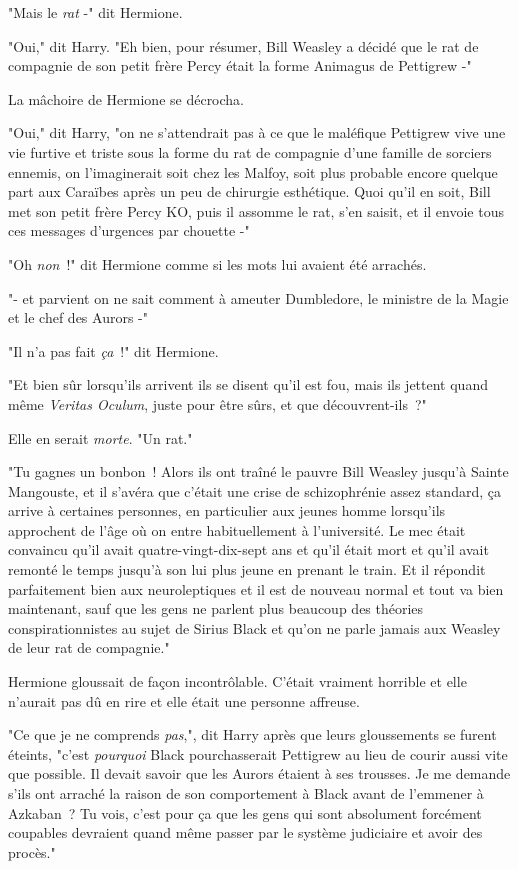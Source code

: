 "Mais le \emph{rat} -" dit Hermione.

"Oui," dit Harry. "Eh bien, pour résumer, Bill Weasley a décidé que le rat de compagnie de son petit frère Percy était la forme Animagus de Pettigrew -"

La mâchoire de Hermione se décrocha.

"Oui," dit Harry, "on ne s'attendrait pas à ce que le maléfique Pettigrew vive une vie furtive et triste sous la forme du rat de compagnie d'une famille de sorciers ennemis, on l'imaginerait soit chez les Malfoy, soit plus probable encore quelque part aux Caraïbes après un peu de chirurgie esthétique. Quoi qu'il en soit, Bill met son petit frère Percy KO, puis il assomme le rat, s'en saisit, et il envoie tous ces messages d'urgences par chouette -"

"Oh \emph{non}~!" dit Hermione comme si les mots lui avaient été arrachés.

"- et parvient on ne sait comment à ameuter Dumbledore, le ministre de la Magie et le chef des Aurors -"

"Il n'a pas fait \emph{ça}~!" dit Hermione.

"Et bien sûr lorsqu'ils arrivent ils se disent qu'il est fou, mais ils jettent quand même \emph{Veritas Oculum}, juste pour être sûrs, et que découvrent-ils~?"

Elle en serait \emph{morte}. "Un rat."

"Tu gagnes un bonbon~! Alors ils ont traîné le pauvre Bill Weasley jusqu'à Sainte Mangouste, et il s'avéra que c'était une crise de schizophrénie assez standard, ça arrive à certaines personnes, en particulier aux jeunes homme lorsqu'ils approchent de l'âge où on entre habituellement à l'université. Le mec était convaincu qu'il avait quatre-vingt-dix-sept ans et qu'il était mort et qu'il avait remonté le temps jusqu'à son lui plus jeune en prenant le train. Et il répondit parfaitement bien aux neuroleptiques et il est de nouveau normal et tout va bien maintenant, sauf que les gens ne parlent plus beaucoup des théories conspirationnistes au sujet de Sirius Black et qu'on ne parle jamais aux Weasley de leur rat de compagnie."

Hermione gloussait de façon incontrôlable. C'était vraiment horrible et elle n'aurait pas dû en rire et elle était une personne affreuse.

"Ce que je ne comprends \emph{pas},", dit Harry après que leurs gloussements se furent éteints, "c'est \emph{pourquoi} Black pourchasserait Pettigrew au lieu de courir aussi vite que possible. Il devait savoir que les Aurors étaient à ses trousses. Je me demande s'ils ont arraché la raison de son comportement à Black avant de l'emmener à Azkaban~? Tu vois, c'est pour ça que les gens qui sont absolument forcément coupables devraient quand même passer par le système judiciaire et avoir des procès."

